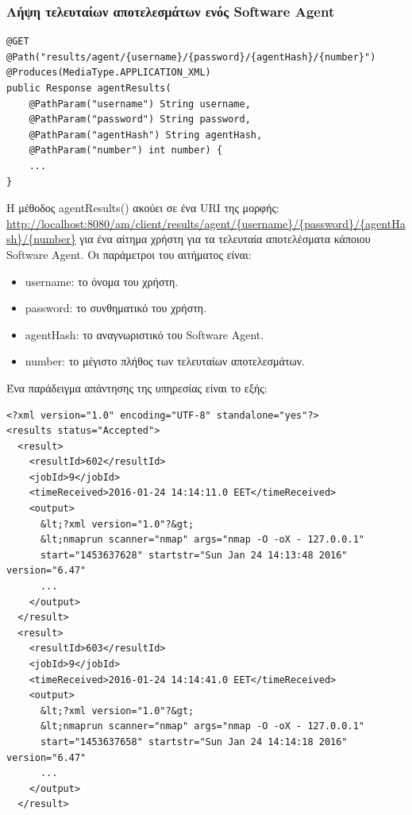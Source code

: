 \documentclass[a4paper,11pt]{article}
\begin{document}
\begin{sloppypar}
\subsubsection{Λήψη τελευταίων αποτελεσμάτων ενός Software Agent}
\begin{lstlisting}
@GET
@Path("results/agent/{username}/{password}/{agentHash}/{number}")
@Produces(MediaType.APPLICATION_XML)
public Response agentResults(
    @PathParam("username") String username,
    @PathParam("password") String password,
    @PathParam("agentHash") String agentHash,
    @PathParam("number") int number) {
    ...
}
\end{lstlisting}
Η μέθοδος agentResults() ακούει σε ένα URI της μορφής:
\\
\url{http://localhost:8080/am/client/results/agent/{username}/{password}/{agentHash}/{number}} για ένα αίτημα χρήστη για τα τελευταία αποτελέσματα κάποιου Software Agent. Οι παράμετροι του αιτήματος είναι:
\begin{itemize}

\item username: το όνομα του χρήστη.
\item password: το συνθηματικό του χρήστη.
\item agentHash: το αναγνωριστικό του Software Agent.
\item number: το μέγιστο πλήθος των τελευταίων αποτελεσμάτων.
\end{itemize}
Ένα παράδειγμα απάντησης της υπηρεσίας είναι το εξής:
\begin{lstlisting}
<?xml version="1.0" encoding="UTF-8" standalone="yes"?>
<results status="Accepted">
  <result>
    <resultId>602</resultId>
    <jobId>9</jobId>
    <timeReceived>2016-01-24 14:14:11.0 EET</timeReceived>
    <output>
      &lt;?xml version="1.0"?&gt;
      &lt;nmaprun scanner="nmap" args="nmap -O -oX - 127.0.0.1"
      start="1453637628" startstr="Sun Jan 24 14:13:48 2016" version="6.47"
      ...
    </output>
  </result>
  <result>
    <resultId>603</resultId>
    <jobId>9</jobId>
    <timeReceived>2016-01-24 14:14:41.0 EET</timeReceived>
    <output>
      &lt;?xml version="1.0"?&gt;
      &lt;nmaprun scanner="nmap" args="nmap -O -oX - 127.0.0.1"
      start="1453637658" startstr="Sun Jan 24 14:14:18 2016" version="6.47"
      ...
    </output>
  </result>


\end{lstlisting}
\end{sloppypar}
\end{document}
